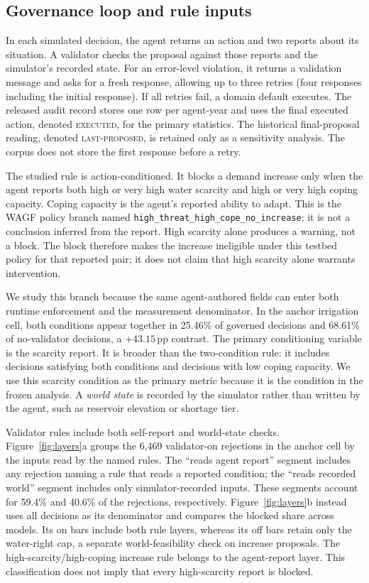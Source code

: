 \documentclass{article}
\newcommand{\lastproposed}{\textsc{last-proposed}}
\newcommand{\executed}{\textsc{executed}}
\newcommand{\pp}{\,\mathrm{pp}}
\begin{document}
\subsection{Governance loop and rule inputs}

In each simulated decision, the agent returns an action and two reports about its situation. A validator checks the proposal against those reports and the simulator's recorded state. For an error-level violation, it returns a validation message and asks for a fresh response, allowing up to three retries (four responses including the initial response). If all retries fail, a domain default executes. The released audit record stores one row per agent-year and uses the final executed action, denoted \executed, for the primary statistics. The historical final-proposal reading, denoted \lastproposed, is retained only as a sensitivity analysis. The corpus does not store the first response before a retry.

The studied rule is action-conditioned. It blocks a demand increase only when the agent reports both high or very high water scarcity and high or very high coping capacity. Coping capacity is the agent's reported ability to adapt. This is the WAGF policy branch named \texttt{high\_threat\_high\_cope\_no\_increase}; it is not a conclusion inferred from the report. High scarcity alone produces a warning, not a block. The block therefore makes the increase ineligible under this testbed policy for that reported pair; it does not claim that high scarcity alone warrants intervention.

We study this branch because the same agent-authored fields can enter both runtime enforcement and the measurement denominator. In the anchor irrigation cell, both conditions appear together in 25.46\% of governed decisions and 68.61\% of no-validator decisions, a $+43.15\pp$ contrast. The primary conditioning variable is the scarcity report. It is broader than the two-condition rule: it includes decisions satisfying both conditions and decisions with low coping capacity. We use this scarcity condition as the primary metric because it is the condition in the frozen analysis. A \emph{world state} is recorded by the simulator rather than written by the agent, such as reservoir elevation or shortage tier.

Validator rules include both self-report and world-state checks. Figure~\ref{fig:layers}a groups the 6,469 validator-on rejections in the anchor cell by the inputs read by the named rules. The ``reads agent report'' segment includes any rejection naming a rule that reads a reported condition; the ``reads recorded world'' segment includes only simulator-recorded inputs. These segments account for 59.4\% and 40.6\% of the rejections, respectively. Figure~\ref{fig:layers}b instead uses all decisions as its denominator and compares the blocked share across models. Its on bars include both rule layers, whereas its off bars retain only the water-right cap, a separate world-feasibility check on increase proposals. The high-scarcity/high-coping increase rule belongs to the agent-report layer. This classification does not imply that every high-scarcity report is blocked.
\end{document}
